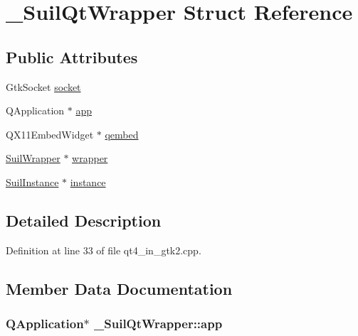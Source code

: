 \hypertarget{struct___suil_qt_wrapper}{}\section{\+\_\+\+Suil\+Qt\+Wrapper Struct Reference}
\label{struct___suil_qt_wrapper}
\subsection*{Public Attributes}
\begin{DoxyCompactItemize}
\item 
Gtk\+Socket \hyperlink{struct___suil_qt_wrapper_a0448246983d048fccd071dece1396bcf}{socket}
\item 
Q\+Application $\ast$ \hyperlink{struct___suil_qt_wrapper_a0a8e16cdfc6c7d9e42543a36bca9782a}{app}
\item 
Q\+X11\+Embed\+Widget $\ast$ \hyperlink{struct___suil_qt_wrapper_ad51ddb6c6576a239f2d1b7a98c61c8b4}{qembed}
\item 
\hyperlink{suil__internal_8h_ae19f6c4d775c4fc1141e4bfbfd8069cd}{Suil\+Wrapper} $\ast$ \hyperlink{struct___suil_qt_wrapper_a57e37e01ccdfe50eedd9ae37c9e8338c}{wrapper}
\item 
\hyperlink{group__suil_ga767e978a8c5f7c0d5246da79c9b97c6b}{Suil\+Instance} $\ast$ \hyperlink{struct___suil_qt_wrapper_ae5e5a3515f9bbcb499e230edbe6a8380}{instance}
\end{DoxyCompactItemize}


\subsection{Detailed Description}


Definition at line 33 of file qt4\+\_\+in\+\_\+gtk2.\+cpp.



\subsection{Member Data Documentation}
\subsubsection[{\texorpdfstring{app}{app}}]{\setlength{\rightskip}{0pt plus 5cm}Q\+Application$\ast$ \+\_\+\+Suil\+Qt\+Wrapper\+::app}\hypertarget{struct___suil_qt_wrapper_a0a8e16cdfc6c7d9e42543a36bca9782a}{}\label{struct___suil_qt_wrapper_a0a8e16cdfc6c7d9e42543a36bca9782a}


